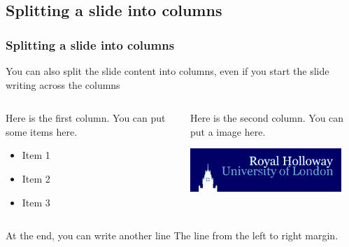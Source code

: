 
\subsection{Splitting a slide into columns}

\begin{frame}
  \frametitle{Splitting a slide into columns}

You can also split the slide content into columns, even if you start the slide writing across the columns
\bigskip
\begin{columns}

  \begin{column}{0.4\textwidth}
    Here is the first column. You can put some items here.
    \begin{itemize}
      \item Item 1
      \item Item 2
      \item Item 3
    \end{itemize}
  \end{column}

  \begin{column}{0.4\textwidth}
    Here is the second column. You can put a image here.
    \centerline{\includegraphics[width=0.9\textwidth]{ISG/graphics/general/rhul-logo-darkblue.png}}
  \end{column}
  
\end{columns}

\bigskip

At the end, you can write another line The line from the left to right margin.

\end{frame}


